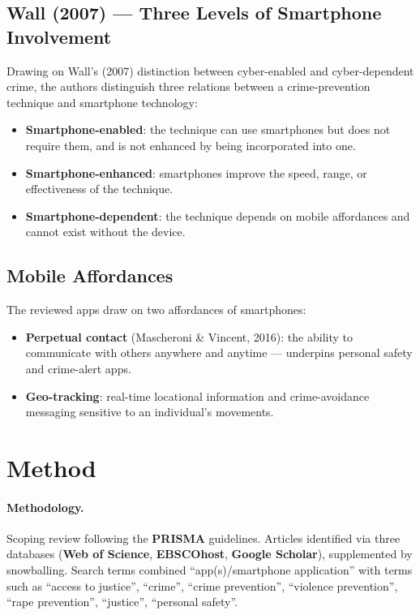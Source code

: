 \documentclass[11pt,a4paper,openany]{report}
\theoremstyle{definition}
\theoremstyle{plain}
\theoremstyle{remark}
\begin{document}
\subsection{Wall (2007) --- Three Levels of Smartphone Involvement}

Drawing on Wall's (2007) distinction between cyber-enabled and cyber-dependent crime, the authors distinguish three relations between a crime-prevention technique and smartphone technology:
\begin{itemize}
    \item \textbf{Smartphone-enabled}: the technique can use smartphones but does not require them, and is not enhanced by being incorporated into one.
    \item \textbf{Smartphone-enhanced}: smartphones improve the speed, range, or effectiveness of the technique.
    \item \textbf{Smartphone-dependent}: the technique depends on mobile affordances and cannot exist without the device.
\end{itemize}

\subsection{Mobile Affordances}

The reviewed apps draw on two affordances of smartphones:
\begin{itemize}
    \item \textbf{Perpetual contact} (Mascheroni \& Vincent, 2016): the ability to communicate with others anywhere and anytime --- underpins personal safety and crime-alert apps.
    \item \textbf{Geo-tracking}: real-time locational information and crime-avoidance messaging sensitive to an individual's movements.
\end{itemize}

\section{Method}

\paragraph{Methodology.} Scoping review following the \textbf{PRISMA} guidelines. Articles identified via three databases (\textbf{Web of Science}, \textbf{EBSCOhost}, \textbf{Google Scholar}), supplemented by snowballing. Search terms combined ``app(s)/smartphone application'' with terms such as ``access to justice'', ``crime'', ``crime prevention'', ``violence prevention'', ``rape prevention'', ``justice'', ``personal safety''.
\end{document}
